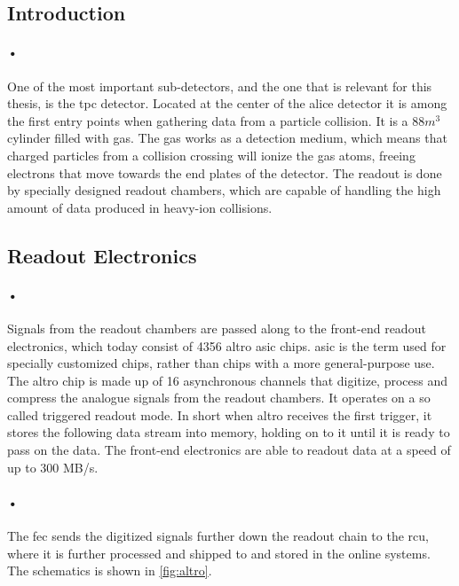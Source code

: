 \documentclass[a4paper, 12pt, openright, twoside]{report}
\begin{document}
\subsection{Introduction}
\paragraph{•}
One of the most important sub-detectors, and the one that is relevant for this thesis, is the \gls{tpc} detector.
Located at the center of the \gls{alice} detector it is among the first entry points when gathering data from a particle collision.
It is a 88\(m^3\) cylinder filled with gas.
The gas works as a detection medium, which means that charged particles from a collision crossing will ionize the gas atoms, freeing electrons that move towards the end plates of the detector.
The readout is done by specially designed readout chambers, which are capable of handling the high amount of data produced in heavy-ion collisions.

\subsection{Readout Electronics} %
\paragraph{•}
Signals from the readout chambers are passed along to the front-end readout electronics, which today consist of 4356 \gls{altro} \gls{asic} chips\cite{altro}.
\gls{asic} is the term used for specially customized chips, rather than chips with a more general-purpose use\cite{asic}.
The \gls{altro} chip is made up of 16 asynchronous channels that digitize, process and compress the analogue signals from the readout chambers.
It operates on a so called triggered readout mode.
In short when \gls{altro} receives the first trigger, it stores the following data stream into memory, holding on to it until it is ready to pass on the data.
The front-end electronics are able to readout data at a speed of up to 300 MB/s.
\paragraph{•}
The \gls{fec} sends the digitized signals further down the readout chain to the \gls{rcu}, where it is further processed and shipped to  and stored in the online systems.
The schematics is shown in \ref{fig:altro}.
\end{document}
